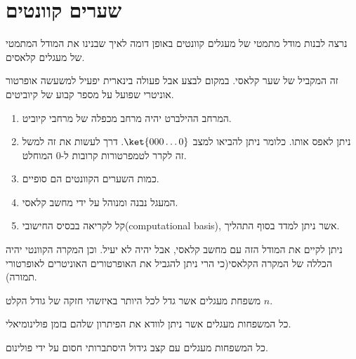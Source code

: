 \documentclass{tstextbook}
\begin{document}
\section{שערים קוונטים}

נרצה לבנות מודל מתמטי של מעגלים קוונטים באופן דומה לאיך שבנינו את המודל המתמטי של מעגלים קלאסים.

\begin{proposition}
זה המקביל של שער קלאסי. במקום לבצע אבל פעולה בינארית יפעיל למשעשה אופרטור אוניטרי שפועל על מספר קבוע של קיוביטים. 

\end{proposition}
\begin{definition}
  \begin{enumerate}
    \item המרחב ההילברט יהיה מרחב מכפלה של מרחבי קיוביט. 


    \item ניתן לאפס אותו. כלומר ניתן להביאו למצב \(\ket{000\dots 0}\). דרך לעשות את זה למשל זה לקרר לטמפרטורות קרובות ל-0 המוחלט. 


    \item כמות השערים הקוונטים הם סופיים. 


    \item המעגל נבנה ומנוהל על ידי מחשב קלאסי. 


    \item קל לקריאה בבסיס החישובי(computational basis), אשר ניתן למדד בסוף התהליך. 


  \end{enumerate}
\end{definition}
\begin{remark}
ניתן לקיים את המודל הזה עם מחשב קלאסי, אבל יהיה לא יעיל. וכן המקרה הקוונטי יהיה הכללה של המקרה הקלאסי(כי הרי ניתן להגביל את האופרטורים האוניטרים לאופרטורי תמורה).

\end{remark}
\begin{definition}[מחלקת P]
משפחת מעגלים אשר גדל לכל היותר באיזשהי חזקה של גודל הקלט \(n\).

\end{definition}
\begin{definition}[מחלקת NP]
כל המשפחות מעגלים אשר ניתן לוודא את הפיתרון שלהם בזמן פולינומיאלי.

\end{definition}
\begin{definition}
כל המשפחות מעגלים עם קצב גידול היסתברותי חסום על ידי פולינום.

\end{definition}
\end{document}
